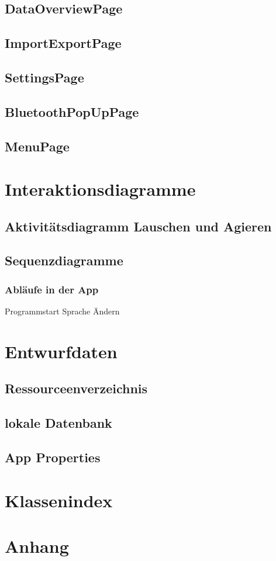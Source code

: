 \documentclass[a4paper,12pt]{article}
\begin{document}
\subsection{DataOverviewPage}
\subsection{ImportExportPage}
\subsection{SettingsPage}
\subsection{BluetoothPopUpPage}
\subsection{MenuPage}
\section{Interaktionsdiagramme}
\subsection{Aktivitätsdiagramm Lauschen und Agieren}
\subsection{Sequenzdiagramme}
\subsubsection{Abläufe in der App}
Programmstart
Sprache Ändern
\section{Entwurfdaten}
\subsection{Ressourceenverzeichnis}
\subsection{lokale Datenbank}
\subsection{App Properties}

\section{Klassenindex}
\section{Anhang}

\clearpage
\printglossaries
{}
\end{document}
